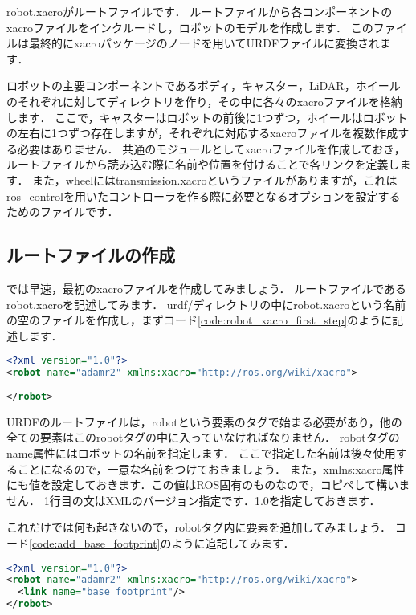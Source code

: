 \documentclass[{../../master}]{subfiles}
\begin{document}
\textsf{robot.xacro}がルートファイルです．
ルートファイルから各コンポーネントのxacroファイルをインクルードし，ロボットのモデルを作成します．
このファイルは最終的に\textsf{xacro}パッケージのノードを用いてURDFファイルに変換されます．

ロボットの主要コンポーネントであるボディ，キャスター，LiDAR，ホイールのそれぞれに対してディレクトリを作り，その中に各々の\textsf{xacro}ファイルを格納します．
ここで，キャスターはロボットの前後に1つずつ，ホイールはロボットの左右に1つずつ存在しますが，それぞれに対応する\textsf{xacro}ファイルを複数作成する必要はありません．
共通のモジュールとして\textsf{xacro}ファイルを作成しておき，ルートファイルから読み込む際に名前や位置を付けることで各リンクを定義します．
また，\textsf{wheel}には\textsf{transmission.xacro}というファイルがありますが，これは\textsf{ros\_control}を用いたコントローラを作る際に必要となるオプションを設定するためのファイルです．

\subsection{ルートファイルの作成}

では早速，最初の\textsf{xacro}ファイルを作成してみましょう．
ルートファイルである\textsf{robot.xacro}を記述してみます．
\textsf{urdf/}ディレクトリの中に\textsf{robot.xacro}という名前の空のファイルを作成し，まずコード\ref{code:robot_xacro_first_step}のように記述します．

\begin{lstlisting}[language=XML, label=code:robot_xacro_first_step, caption=\textsf{robot.xacro}]
<?xml version="1.0"?>
<robot name="adamr2" xmlns:xacro="http://ros.org/wiki/xacro">
 
</robot>
\end{lstlisting}

URDFのルートファイルは，\textsf{robot}という要素のタグで始まる必要があり，他の全ての要素はこの\textsf{robot}タグの中に入っていなければなりません．\cite{urdf_xml_robot}
\textsf{robot}タグの\textsf{name}属性にはロボットの名前を指定します．
ここで指定した名前は後々使用することになるので，一意な名前をつけておきましょう．
また，\textsf{xmlns:xacro}属性にも値を設定しておきます．この値はROS固有のものなので，コピペして構いません．
1行目の文はXMLのバージョン指定です．1.0を指定しておきます．

これだけでは何も起きないので，\textsf{robot}タグ内に要素を追加してみましょう．
コード\ref{code:add_base_footprint}のように追記してみます．

\begin{lstlisting}[language=XML, label=code:add_base_footprint, caption=\textsf{robot.xacro}]
<?xml version="1.0"?>
<robot name="adamr2" xmlns:xacro="http://ros.org/wiki/xacro">
  <link name="base_footprint"/>
</robot>
\end{lstlisting}
\end{document}
